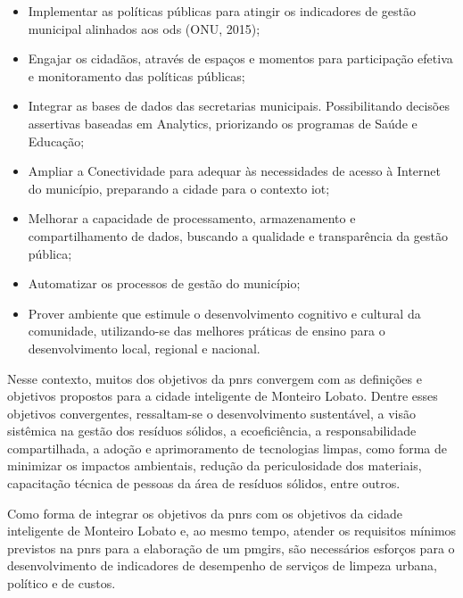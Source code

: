 \begin{itemize}
	\item Implementar as políticas públicas para atingir os indicadores de gestão municipal alinhados aos \gls{ods} (ONU, 2015);
	
	\item Engajar os cidadãos, através de espaços e momentos para participação efetiva e monitoramento das políticas públicas;
	
	\item Integrar as bases de dados das secretarias municipais. Possibilitando decisões assertivas baseadas em Analytics, priorizando os programas de Saúde e Educação;
	
	\item Ampliar a Conectividade para adequar às necessidades de acesso à Internet do município, preparando a cidade para o contexto \gls{iot};
	
	\item Melhorar a capacidade de processamento, armazenamento e compartilhamento de dados, buscando a qualidade e transparência da gestão pública;
	
	\item Automatizar os processos de gestão do município;
	
	\item Prover ambiente que estimule o desenvolvimento cognitivo e cultural da comunidade, utilizando-se das melhores práticas de ensino para o desenvolvimento local, regional e nacional.
\end{itemize}

Nesse contexto, muitos dos objetivos da \gls{pnrs} \cite{brasil:12305} convergem com as definições e objetivos propostos para a cidade inteligente de Monteiro Lobato. Dentre esses objetivos convergentes, ressaltam-se o desenvolvimento sustentável, a visão sistêmica na gestão dos resíduos sólidos, a ecoeficiência, a responsabilidade compartilhada, a adoção e aprimoramento de tecnologias limpas, como forma de minimizar os impactos ambientais, redução da periculosidade dos materiais, capacitação técnica de pessoas da área de resíduos sólidos, entre outros. 

Como forma de integrar os objetivos da \gls{pnrs} com os objetivos da cidade inteligente de Monteiro Lobato e, ao mesmo tempo, atender os requisitos mínimos previstos na \gls{pnrs} para a elaboração de um \gls{pmgirs}, são necessários esforços para o desenvolvimento de indicadores de desempenho de serviços de limpeza urbana, político e de custos. 


